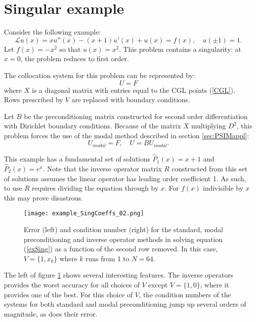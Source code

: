 \documentclass{sfuthesis}
\begin{document}
\section{Singular example}

Consider the following example:
\begin{equation} \label{exSing}
\mathcal{L} u(x) = x u''(x) - (x+1) u'(x) + u(x) = f(x), \quad u(\pm 1) = 1.
\end{equation}
Let $f(x) = -x^2$ so that $u(x) = x^2$.
This problem contains a singularity: at $x=0$, the problem reduces to first order.

The collocation system for this problem can be represented by:
\begin{equation}
[ X D^2 - (X+1) D + I ] U = F
\end{equation}
where $X$ is a diagonal matrix with entries equal to the CGL points (\ref{CGL}).
Rows prescribed by $V$ are replaced with boundary conditions.

Let $B$ be the preconditioning matrix constructed for second order differentiation with Dirichlet boundary conditions.
Because of the matrix $X$ multiplying $D^2$, this problem forces the use of the modal method described in section \ref{sec:PSIMappl}:
\begin{equation}
[ X - (X+1) D B + B ] U_{modal} = F, \quad U = B U_{modal} .
\end{equation}

This example has a fundamental set of solutions $\hat{P}_1(x) = x+1$ and $\hat{P}_2(x) = e^x$.
Note that the inverse operator matrix $R$ constructed from this set of solutions assumes the linear operator has leading order coefficient 1.
As such, to use $R$ requires dividing the equation through by $x$.
For $f(x)$ indivisible by $x$ this may prove disastrous.

\begin{figure}
\texttt{[image: example\_SingCoeffs\_02.png]}
\caption{Error (left) and condition number (right) for the standard, modal preconditioning and inverse operator methods in solving equation (\ref{exSing}) as a function of the second row removed. In this case, $V = \{1, x_k \}$ where $k$ runs from 1 to $N = 64$.}
\label{fig:SingCoeffs V}
\end{figure}

The left of figure \ref{fig:SingCoeffs V} shows several interesting features.
The inverse operators provides the worst accuracy for all choices of $V$ except $V = \{1, 0\}$, where it provides one of the best.
For this choice of $V$, the condition numbers of the systems for both standard and modal preconditioning jump up several orders of magnitude, as does their error.
\end{document}

